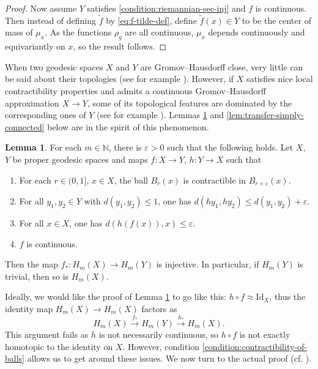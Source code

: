 \documentclass[12pt]{amsart}
\theoremstyle{definition}
\def\fnum{equation}
\newtheorem{lemma}[\fnum]{Lemma}
\numberwithin{equation}{section}
\newcommand{\Id}{\text{Id}}
\begin{document}
\begin{proof}
    Now assume $Y$ satisfies \eqref{condition:riemannian-sec-inj} and $f$ is continuous. Then instead of defining $\tilde{f} $ by  \eqref{eq:f-tilde-def},  define $\tilde{f} (x) \in Y $ to be the center of mass of $\mu_x$. As the functions $\rho _g$ are all continuous, $\mu _ x$ depends continuously and equivariantly on $x$, so the result follows.
\end{proof}

When two geodesic spaces $X$ and $Y$ are Gromov--Hausdorff close, very little can be said about their topologies (see for example \cite{ferry-okun}). However, if $X$ satisfies nice local contractibility properties and admits a continuous Gromov--Hausdorff approximation $X \to Y$, some of its topological features are dominated by the corresponding ones of $Y$ (see for example \cite{petersen}). Lemmas \ref{lem:transfer-trivial-homology} and \ref{lem:transfer-simply-connected} below are in the spirit of this phenomenon. 



\begin{lemma}\label{lem:transfer-trivial-homology}
 For each $m \in \mathbb{N}$, there is $\varepsilon > 0 $ such that the following holds. Let $X$, $Y$ be proper geodesic spaces and maps $f: X \to Y$, $h : Y \to X$ such that 
 \begin{enumerate}[1.]
     \item For each $r \in ( 0 , 1 ]$, $x \in X$, the ball $B_r(x)$ is contractible in $B_{r + \varepsilon }(x)$.\label{condition:contractibility-of-balls}
     \item  For all $y_1, y_2 \in Y$ with $d(y_1, y_2) \leq 1$, one has $d( hy_1, hy_2 ) \leq d(y_1, y_2 ) + \varepsilon $.\label{condition:h-non-expanding}
     \item  For all $x \in X$, one has $d( h (f (x)) , x ) \leq \varepsilon$.\label{condition:hf-id}
     \item  $f$ is continuous.\label{condition:f-continuous}
 \end{enumerate}
 Then the map $f_{\ast} : H_m (X) \to H_m (Y)$ is injective. In particular, if $H_m(Y) $ is trivial, then so is $H_m (X)$. 
\end{lemma}



Ideally, we would like the proof of Lemma \ref{lem:transfer-trivial-homology} to go like this: $h \circ f \approx \Id _X $, thus the identity map $H_m (X) \to H_m (X)$ factors as 
\[      H_m (X) \xrightarrow{f_{\ast}} H_m(Y) \xrightarrow{h_{\ast}} H_m (X)  .  \]
This argument fails as $h$ is not necessarily continuous, so $h \circ f$ is not exactly  homotopic to the identity on $X$. However, condition \eqref{condition:contractibility-of-balls} allows us to get around these issues. We now turn to the actual proof (cf. \cite[Proposition 1.3]{yamaguchi}).
\end{document}
